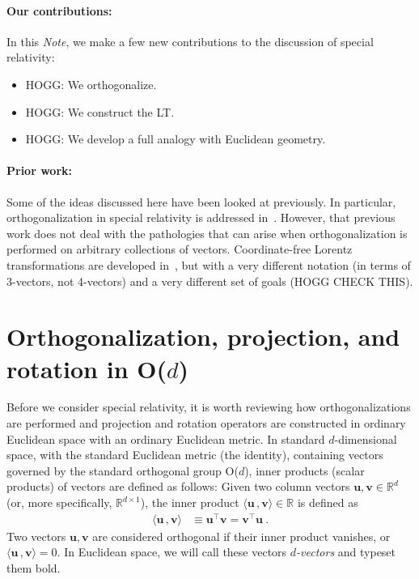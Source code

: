 \documentclass{article}
\newcommand{\Evec}[1]{{\mathbf{#1}}} %
\newcommand{\inner}[2]{\langle{#1}\,,{#2}\rangle}
\newcommand{\documentname}{\textsl{Note}}
\begin{document}
\paragraph{Our contributions:}
In this \documentname, we make a few new contributions to the discussion of special relativity:
\begin{itemize}
\item
HOGG: We orthogonalize.
\item
HOGG: We construct the LT.
\item
HOGG: We develop a full analogy with Euclidean geometry.
\end{itemize}

\paragraph{Prior work:}
Some of the ideas discussed here have been looked at previously.
In particular, orthogonalization in special relativity is addressed in~\cite{joot}.
However, that previous work does not deal with the pathologies that can arise when orthogonalization is performed on arbitrary collections of vectors.
Coordinate-free Lorentz transformations are developed in~\cite{wagner}, but with a very different notation (in terms of 3-vectors, not 4-vectors) and a very different set of goals (HOGG CHECK THIS).

\section{Orthogonalization, projection, and rotation in O($d$)}\label{sec:od}

Before we consider special relativity, it is worth reviewing how orthogonalizations are performed and projection and rotation operators are constructed in ordinary Euclidean space with an ordinary Euclidean metric.
In standard $d$-dimensional space, with the standard Euclidean metric (the identity), containing vectors governed by the standard orthogonal group O($d$), inner products (scalar products) of vectors are defined as follows:
Given two column vectors $\Evec{u},\Evec{v}\in\mathbb{R}^d$ (or, more specifically, $\mathbb{R}^{d\times1}$), the inner product $\inner{\Evec{u}}{\Evec{v}}\in\mathbb{R}$ is defined as
\begin{align}
    \inner{\Evec{u}}{\Evec{v}} &\equiv \Evec{u}^\top \Evec{v} = \Evec{v}^\top \Evec{u} ~.
\end{align}
Two vectors $\Evec{u},\Evec{v}$ are considered orthogonal if their inner product vanishes, or $\inner{\Evec{u}}{\Evec{v}}=0$.
In Euclidean space, we will call these vectors \emph{$d$-vectors} and typeset them bold.
\end{document}
